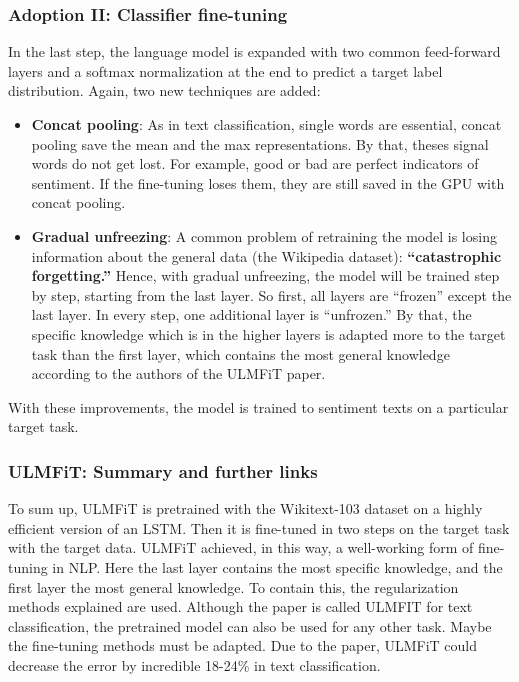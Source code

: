 \documentclass[]{krantz}
\begin{document}
\hypertarget{adoption-ii-classifier-fine-tuning}{%
\subsubsection{Adoption II: Classifier fine-tuning}\label{adoption-ii-classifier-fine-tuning}}

In the last step, the language model is expanded with two common feed-forward layers and a softmax normalization at the end to predict a target label distribution. Again, two new techniques are added:

\begin{itemize}
\item
  \textbf{Concat pooling}:
  As in text classification, single words are essential, concat pooling save the mean and the max representations. By that, theses signal words do not get lost. For example, good or bad are perfect indicators of sentiment. If the fine-tuning loses them, they are still saved in the GPU with concat pooling.
\item
  \textbf{Gradual unfreezing}:
  A common problem of retraining the model is losing information about the general data (the Wikipedia dataset): \textbf{``catastrophic forgetting.''} Hence, with gradual unfreezing, the model will be trained step by step, starting from the last layer. So first, all layers are ``frozen'' except the last layer. In every step, one additional layer is ``unfrozen.'' By that, the specific knowledge which is in the higher layers is adapted more to the target task than the first layer, which contains the most general knowledge according to the authors of the ULMFiT paper.
\end{itemize}

With these improvements, the model is trained to sentiment texts on a particular target task.

\hypertarget{ulmfit-summary-and-further-links}{%
\subsubsection{ULMFiT: Summary and further links}\label{ulmfit-summary-and-further-links}}

To sum up, ULMFiT is pretrained with the Wikitext-103 dataset on a highly efficient version of an LSTM. Then it is fine-tuned in two steps on the target task with the target data.
ULMFiT achieved, in this way, a well-working form of fine-tuning in NLP. Here the last layer contains the most specific knowledge, and the first layer the most general knowledge. To contain this, the regularization methods explained are used.
Although the paper is called ULMFIT for text classification, the pretrained model can also be used for any other task. Maybe the fine-tuning methods must be adapted.
Due to the paper, ULMFiT could decrease the error by incredible 18-24\% in text classification.
\end{document}
